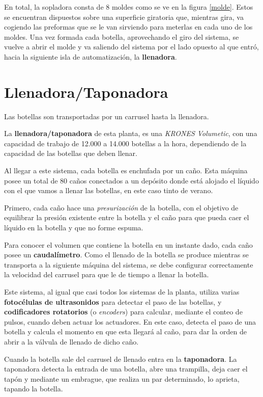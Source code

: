 \documentclass[11pt,a4paper,spanish,twoside]{report}
\begin{document}
En total, la sopladora consta de 8 moldes como se ve en la figura \ref{molde}. Estos se encuentran dispuestos 
sobre una superficie giratoria que, mientras gira, va cogiendo las preformas 
que se le van sirviendo para meterlas en cada uno de los moldes. Una vez 
formada cada botella, aprovechando el giro del sistema, se vuelve a abrir el 
molde y va saliendo del sistema por el lado opuesto al que entró, hacia la 
siguiente isla de automatización, la \textbf{llenadora}.

\section{Llenadora/Taponadora}
Las botellas son transportadas por un carrusel hasta la llenadora.

La \textbf{llenadora/taponadora} de esta planta, es una \emph{KRONES Volumetic}, con 
una capacidad de trabajo de 12.000 a 14.000 botellas a la hora, dependiendo de
la capacidad de las botellas que deben llenar.

Al llegar a este sistema, cada botella es enchufada por un caño. Esta máquina 
posee un total de 80 caños conectados a un depósito donde está alojado el 
líquido con el que vamos a llenar las botellas, en este caso tinto de verano.

Primero, cada caño hace una \emph{presurización} de la botella, con el 
objetivo de equilibrar la presión existente entre la botella y el caño para 
que pueda caer el líquido en la botella y que no forme espuma.

Para conocer el volumen que contiene la botella en un instante dado, cada caño 
posee un \textbf{caudalímetro}. Como el llenado de la botella se produce
mientras se transporta a la siguiente máquina del sistema, se debe configurar
correctamente la velocidad del carrusel para que le de tiempo a llenar la 
botella.

Este sistema, al igual que casi todos los sistemas de la planta, utiliza 
varias \textbf{fotocélulas de ultrasonidos} para detectar el paso de las 
botellas, y \textbf{codificadores rotatorios} (o \emph{\emph{encoder}s}) para 
calcular, mediante el conteo de pulsos, cuando deben actuar los actuadores. 
En este caso, detecta el paso de una botella y calcula el momento en que esta 
llegará al caño, para dar la orden de abrir a la válvula de llenado de dicho 
caño.

Cuando la botella sale del carrusel de llenado entra en la \textbf{taponadora}.
La taponadora detecta la entrada de una botella, abre una trampilla, deja caer 
el tapón y mediante un embrague, que realiza un par determinado, lo aprieta, 
tapando la botella.
\end{document}
